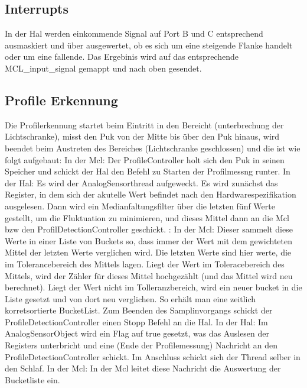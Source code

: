 \documentclass[
   draft=false
  ,paper=a4
  ,twoside=true
  ,fontsize=11pt
  ,headsepline
  ,DIV11
  ,parskip=full+
]{scrartcl} %
\begin{document}
\subsection{Interrupts}
In der Hal werden einkommende Signal auf Port B und C entsprechend ausmaskiert und über ausgewertet, ob es sich um eine steigende Flanke handelt oder um eine fallende. Das Ergebinis wird auf das entsprechende MCL\_input\_signal gemappt und nach oben gesendet.

\subsection{Profile Erkennung}
Die Profilerkennung startet beim Eintritt in den Bereicht (unterbrechung der Lichtschranke), misst den Puk von der Mitte bis über den Puk hinaus, wird beendet beim Austreten des Bereiches (Lichtschranke geschlossen) und die ist wie folgt aufgebaut: 
\newline
In der Mcl:
Der ProfileController holt sich den Puk in seinen Speicher und schickt der Hal den Befehl zu Starten der Profilmessng runter.
\newline
In der Hal:
Es wird der AnalogSensorthread aufgeweckt.
Es wird zunächst das Register, in dem sich der akutelle Wert befindet nach den
Hardwarespezifikation ausgelesen. Dann wird ein Medianfaltungsfilter über die letzten fünf Werte gestellt, um die Fluktuation zu minimieren, und dieses Mittel dann an die Mcl bzw den ProfilDetectionController geschickt.
\newline:
In der Mcl:
Dieser sammelt diese Werte in einer Liste von Buckets so, dass immer der Wert mit dem gewichteten Mittel der letzten Werte verglichen wird. Die letzten Werte sind hier werte, die im Tolerancebereich des Mittels lagen. Liegt der Wert im Toleracebereich des Mittels, wird der Zähler für dieses Mittel hochgezählt (und das Mittel wird neu berechnet). Liegt der Wert nicht im Tolleranzbereich, wird ein neuer bucket in die Liste gesetzt und von dort neu verglichen. So erhält man eine zeitlich korretsortierte BucketList. 
Zum Beenden des Samplinvorgangs schickt der ProfileDetectionController einen Stopp Befehl an die Hal.
\newline
In der Hal:
Im AnalogSensorObject wird ein Flag auf true gesetzt, was das Auslesen der Registers unterbricht und eine (Ende der Profilemessung) Nachricht an den ProfileDetectionController schickt. Im Anschluss schickt sich der Thread selber in den Schlaf.
\newline
In der Mcl:
In der Mcl leitet diese Nachricht die Auswertung der Bucketliste ein.
\end{document}
